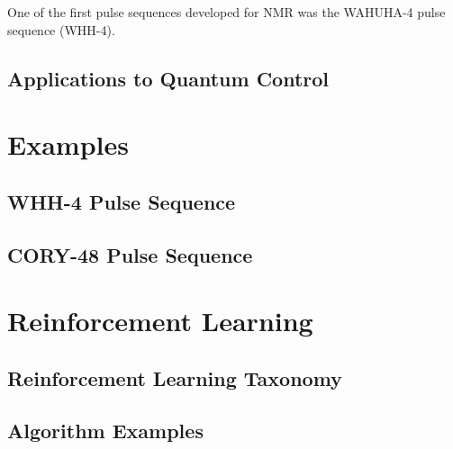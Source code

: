 One of the first pulse sequences developed for NMR was the WAHUHA-4 pulse sequence (WHH-4).\cite{PhysRevLett.20.180}





\subsection{Applications to Quantum Control}


\lipsum[1-5]


\section{Examples}

\lipsum[1]

\subsection{WHH-4 Pulse Sequence}

\lipsum[1-3]

\subsection{CORY-48 Pulse Sequence}

\lipsum[1-3]



\section{Reinforcement Learning}

\lipsum[1-3]

\subsection{Reinforcement Learning Taxonomy}

\lipsum[1-5]

\subsection{Algorithm Examples}


\lipsum[1-5]
